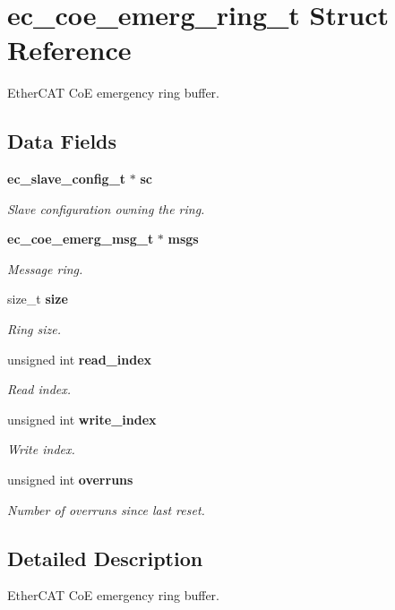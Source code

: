 \section{ec\-\_\-coe\-\_\-emerg\-\_\-ring\-\_\-t Struct Reference}
\label{structec__coe__emerg__ring__t}


Ether\-C\-A\-T Co\-E emergency ring buffer.  


\subsection*{Data Fields}
\begin{DoxyCompactItemize}
\item 
{\bf ec\-\_\-slave\-\_\-config\-\_\-t} $\ast$ {\bf sc}
\begin{DoxyCompactList}\small\item\em Slave configuration owning the ring. \end{DoxyCompactList}\item 
{\bf ec\-\_\-coe\-\_\-emerg\-\_\-msg\-\_\-t} $\ast$ {\bf msgs}
\begin{DoxyCompactList}\small\item\em Message ring. \end{DoxyCompactList}\item 
size\-\_\-t {\bf size}
\begin{DoxyCompactList}\small\item\em Ring size. \end{DoxyCompactList}\item 
unsigned int {\bf read\-\_\-index}
\begin{DoxyCompactList}\small\item\em Read index. \end{DoxyCompactList}\item 
unsigned int {\bf write\-\_\-index}
\begin{DoxyCompactList}\small\item\em Write index. \end{DoxyCompactList}\item 
unsigned int {\bf overruns}
\begin{DoxyCompactList}\small\item\em Number of overruns since last reset. \end{DoxyCompactList}\end{DoxyCompactItemize}


\subsection{Detailed Description}
Ether\-C\-A\-T Co\-E emergency ring buffer. 

